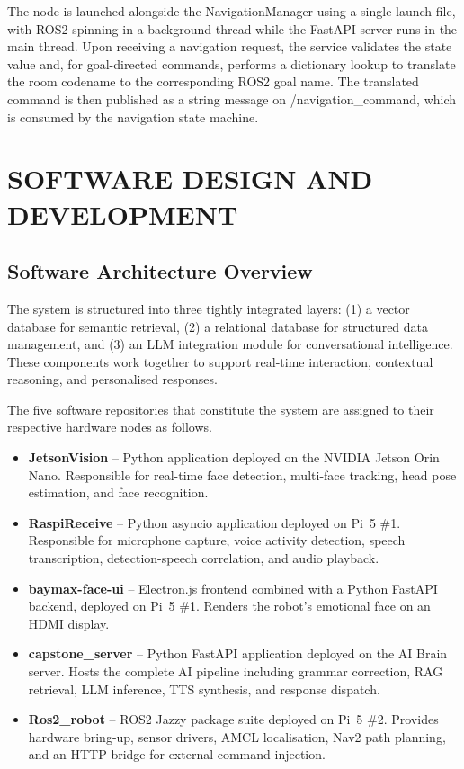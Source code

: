 The node is launched alongside the NavigationManager using a single launch file, with ROS2 spinning in a background thread while the FastAPI server runs in the main thread. Upon receiving a navigation request, the service validates the state value and, for goal-directed commands, performs a dictionary lookup to translate the room codename to the corresponding ROS2 goal name. The translated command is then published as a string message on /navigation\_command, which is consumed by the navigation state machine.

\section{SOFTWARE DESIGN AND DEVELOPMENT}

\subsection{Software Architecture Overview}

The system is structured into three tightly integrated layers: (1) a vector database for semantic retrieval, (2) a relational database for structured data management, and (3) an LLM integration module for conversational intelligence. These components work together to support real-time interaction, contextual reasoning, and personalised responses.

The five software repositories that constitute the system are assigned to their respective hardware nodes as follows.

\begin{itemize}
    \item \textbf{JetsonVision} -- Python application deployed on the NVIDIA Jetson Orin Nano. Responsible for real-time face detection, multi-face tracking, head pose estimation, and face recognition.

    \item \textbf{RaspiReceive} -- Python asyncio application deployed on Pi~5 \#1. Responsible for microphone capture, voice activity detection, speech transcription, detection-speech correlation, and audio playback.

    \item \textbf{baymax-face-ui} -- Electron.js frontend combined with a Python FastAPI backend, deployed on Pi~5 \#1. Renders the robot's emotional face on an HDMI display.

    \item \textbf{capstone\_server} -- Python FastAPI application deployed on the AI Brain server. Hosts the complete AI pipeline including grammar correction, RAG retrieval, LLM inference, TTS synthesis, and response dispatch.

    \item \textbf{Ros2\_robot} -- ROS2 Jazzy package suite deployed on Pi~5 \#2. Provides hardware bring-up, sensor drivers, AMCL localisation, Nav2 path planning, and an HTTP bridge for external command injection.
\end{itemize}

